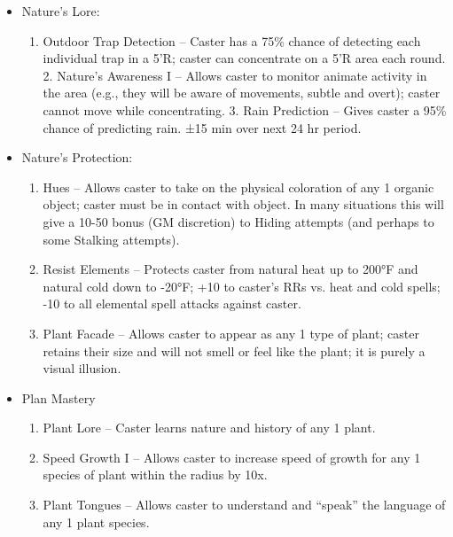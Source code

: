 \documentclass[oneside,12pt]{book}
\begin{document}
\begin{flushleft}
\begin{description}
{\begin{itemize}
\begin{enumerate}
\scriptsize
\item Herb Lore – Caster can understand the nature, origin,
and value of any 1 herb (a plant used in medicine); if
the plant is not an herb (i.e., is inedible or lacks
medicinal use), no information will be related.
\item Herb Enhancement – Allows caster to enhance the
potency of any 1 growing herb by 100\% (i.e., x2); spell
may be employed only once per herb.
\item Herb Finding I – Allows caster to locate any 1 specific
variety of herb that is sought, regardless of physical
obstacles: gives exact direction, distance, and quantity.
\end{enumerate}
\item Nature's Lore:
\begin{enumerate}
\scriptsize
\item Outdoor Trap Detection – Caster has a 75\% chance of
detecting each individual trap in a 5’R; caster can
concentrate on a 5’R area each round.
2. Nature’s Awareness I – Allows caster to monitor
animate activity in the area (e.g., they will be aware of
movements, subtle and overt); caster cannot move
while concentrating.
3. Rain Prediction – Gives caster a 95\% chance of
predicting rain. ±15 min over next 24 hr period.
\end{enumerate}
\item Nature's Protection:
\begin{enumerate}
\scriptsize
\item Hues – Allows caster to take on the physical coloration of
any 1 organic object; caster must be in contact with
object. In many situations this will give a 10-50 bonus
(GM discretion) to Hiding attempts (and perhaps to
some Stalking attempts).
\item Resist Elements – Protects caster from natural heat up
to 200°F and natural cold down to -20°F; +10 to
caster’s RRs vs. heat and cold spells; -10 to all
elemental spell attacks against caster.
\item Plant Facade – Allows caster to appear as any 1 type of
plant; caster retains their size and will not smell or feel
like the plant; it is purely a visual illusion.
\end{enumerate}
\item Plan Mastery
\begin{enumerate}
\scriptsize
\item Plant Lore – Caster learns nature and history of any 1
plant.
\item Speed Growth I – Allows caster to increase speed of growth
for any 1 species of plant within the radius by 10x.
\item Plant Tongues – Allows caster to understand and “speak”
the language of any 1 plant species.
\end{enumerate}
\end{itemize}
}
\end{description}

\end{flushleft}
\end{document}
